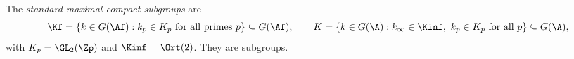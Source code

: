 The \emph{standard maximal compact subgroups} are
\[
  \Kf=\{k\in G(\Af):k_p\in K_p\text{ for all primes }p\}\subseteq G(\Af),\qquad
  K=\{k\in G(\A):k_\infty\in\Kinf,\ k_p\in K_p\text{ for all }p\}\subseteq G(\A),
\]
with $K_p=\GL_2(\Zp)$ and $\Kinf=\Ort(2)$. They are subgroups.
